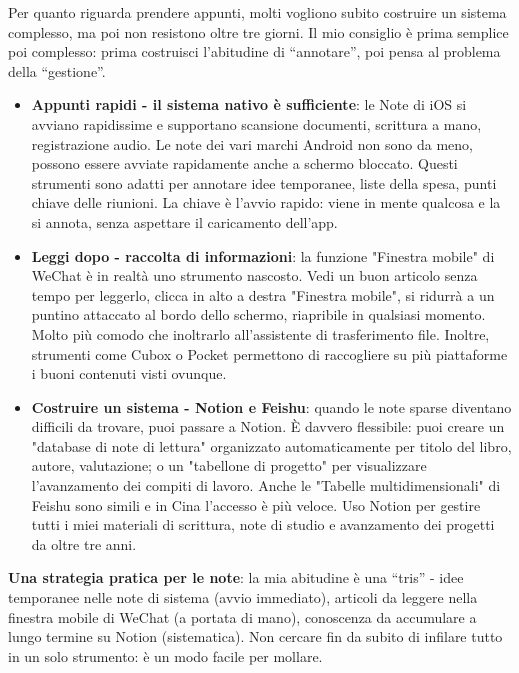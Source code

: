 
Per quanto riguarda prendere appunti, molti vogliono subito costruire un sistema complesso, ma poi non resistono oltre tre giorni. Il mio consiglio è prima semplice poi complesso: prima costruisci l'abitudine di “annotare”, poi pensa al problema della “gestione”.

\begin{itemize}
  \item \textbf{Appunti rapidi - il sistema nativo è sufficiente}: le Note di iOS si avviano rapidissime e supportano scansione documenti, scrittura a mano, registrazione audio. Le note dei vari marchi Android non sono da meno, possono essere avviate rapidamente anche a schermo bloccato. Questi strumenti sono adatti per annotare idee temporanee, liste della spesa, punti chiave delle riunioni. La chiave è l'avvio rapido: viene in mente qualcosa e la si annota, senza aspettare il caricamento dell'app.
  \item \textbf{Leggi dopo - raccolta di informazioni}: la funzione "Finestra mobile" di WeChat è in realtà uno strumento nascosto. Vedi un buon articolo senza tempo per leggerlo, clicca in alto a destra "Finestra mobile", si ridurrà a un puntino attaccato al bordo dello schermo, riapribile in qualsiasi momento. Molto più comodo che inoltrarlo all'assistente di trasferimento file. Inoltre, strumenti come Cubox o Pocket permettono di raccogliere su più piattaforme i buoni contenuti visti ovunque.
  \item \textbf{Costruire un sistema - Notion e Feishu}: quando le note sparse diventano difficili da trovare, puoi passare a Notion. È davvero flessibile: puoi creare un "database di note di lettura" organizzato automaticamente per titolo del libro, autore, valutazione; o un "tabellone di progetto" per visualizzare l'avanzamento dei compiti di lavoro. Anche le "Tabelle multidimensionali" di Feishu sono simili e in Cina l'accesso è più veloce. Uso Notion per gestire tutti i miei materiali di scrittura, note di studio e avanzamento dei progetti da oltre tre anni.
\end{itemize}

\textbf{Una strategia pratica per le note}: la mia abitudine è una “tris” - idee temporanee nelle note di sistema (avvio immediato), articoli da leggere nella finestra mobile di WeChat (a portata di mano), conoscenza da accumulare a lungo termine su Notion (sistematica). Non cercare fin da subito di infilare tutto in un solo strumento: è un modo facile per mollare.

